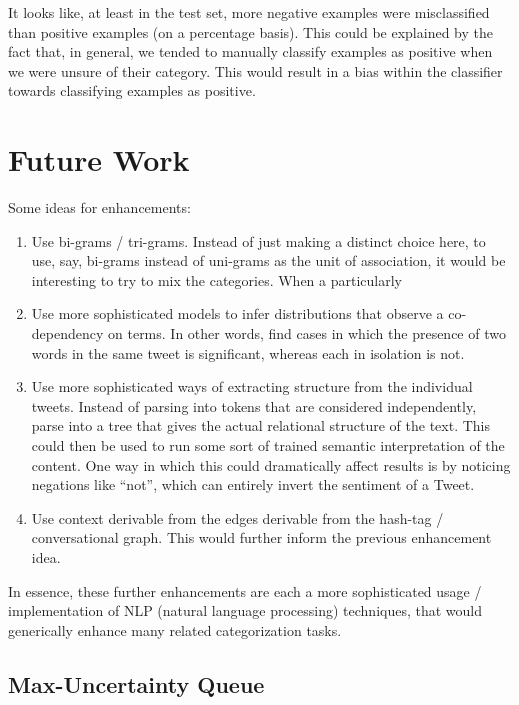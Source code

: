 \documentclass[12pt,a4paper]{article}
\begin{document}
It looks like, at least in the test set, more negative examples were misclassified than positive examples (on a percentage basis). This could be explained by the fact that, in general, we tended to manually classify examples as positive when we were unsure of their category. This would result in a bias within the classifier towards classifying examples as positive.

\section { Future Work }

Some ideas for enhancements:

\begin{enumerate}[1)]
\item Use bi-grams / tri-grams.  Instead of just making a distinct choice here, to use, say, bi-grams instead of uni-grams as the unit of association, it would be interesting to try to mix the categories.  When a particularly 

\item Use more sophisticated models to infer distributions that observe a co-dependency on terms.  In other words, find cases in which the presence of two words in the same tweet is significant, whereas each in isolation is not.

\item Use more sophisticated ways of extracting structure from the individual tweets.  Instead of parsing into tokens that are considered independently, parse into a tree that gives the actual relational structure of the text.  This could then be used to run some sort of trained semantic interpretation of the content.  One way in which this could dramatically affect results is by noticing negations like ``not'', which can entirely invert the sentiment of a Tweet.

\item Use context derivable from the edges derivable from the hash-tag / conversational graph.  This would further inform the previous enhancement idea.
\end{enumerate}

In essence, these further enhancements are each a more sophisticated usage / implementation of NLP (natural language processing) techniques, that would generically enhance many related categorization tasks.

\subsection { Max-Uncertainty Queue }
\end{document}
